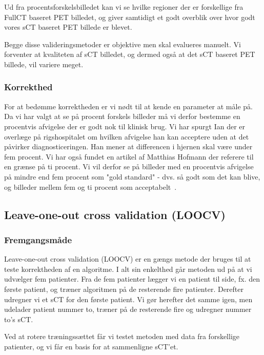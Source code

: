 Ud fra procentsforskelsbilledet kan vi se hvilke regioner der er forskellige fra FullCT baseret PET billedet, og giver samtidigt et godt overblik over hvor godt vores sCT baseret PET billede er blevet.

Begge disse valideringsmetoder er objektive men skal evalueres manuelt. Vi forventer at kvaliteten af sCT billedet, og dermed også at det sCT baseret PET billede, vil variere meget.

\subsubsection{Korrekthed}

For at bedømme korrektheden er vi nødt til at kende en parameter at måle på. Da vi har valgt at se på procent forskels billeder må vi derfor bestemme en procentvis afvigelse der er godt nok til klinisk brug. Vi har spurgt Ian der er overlæge på rigshospitalet om hvilken afvigelse han kan acceptere uden at det påvirker diagnosticeringen. Han mener at differencen i hjernen skal være under fem procent. Vi har også fundet en artikel af Matthias Hofmann der referere til en grænse på ti procent. Vi vil derfor se på billeder med en procentvis afvigelse på mindre end fem procent som "gold standard" - dvs. så godt som det kan blive, og billeder mellem fem og ti procent som acceptabelt~\cite{accepteretAfvigelse}.


\subsection{Leave-one-out cross validation (LOOCV)}
\subsubsection{Fremgangsmåde}
Leave-one-out cross validation (LOOCV) er en gængs metode der bruges til at teste korrektheden af en algoritme. I alt sin enkelthed går metoden ud på at vi udvælger fem patienter. Fra de fem patienter lægger vi en patient til side, fx. den første patient, og træner algoritmen på de resterende fire patienter. Derefter udregner vi et sCT for den første patient. Vi gør herefter det samme igen, men udelader patient nummer to, træner på de resterende fire og udregner nummer to's sCT. 

Ved at rotere træningssættet får vi testet metoden med data fra forskellige patienter, og vi får en basis for at sammenligne sCT'et.

